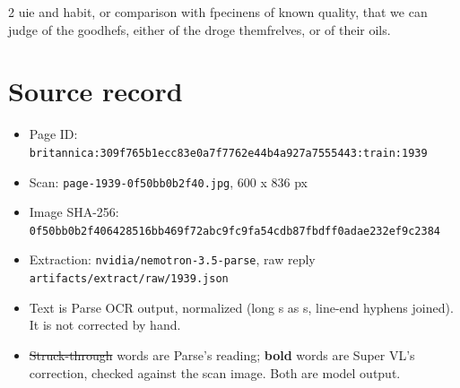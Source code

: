 \documentclass[10pt]{article}
\begin{document}
\begin{multicols}{2}
uie and habit, or comparison with fpecinens of known quality, that we can judge of the goodhefs, either of the droge themfrelves, or of their oils.
\end{multicols}
\section*{Source record}
\begin{itemize}
\item Page ID: \texttt{britannica:309f765b1ecc83e0a7f7762e44b4a927a7555443:train:1939}
\item Scan: \texttt{page-1939-0f50bb0b2f40.jpg}, 600 x 836 px
\item Image SHA-256: \texttt{\small 0f50bb0b2f406428516bb469f72abc9fc9fa54cdb87fbdff0adae232ef9c2384}
\item Extraction: \texttt{nvidia/nemotron-3.5-parse}, raw reply \texttt{artifacts/extract/raw/1939.json}
\item Text is Parse OCR output, normalized (long s as s, line-end hyphens joined). It is not corrected by hand.
\item \sout{Struck-through} words are Parse's reading; \textbf{bold} words are Super VL's correction, checked against the scan image. Both are model output.
\end{itemize}
\end{document}
